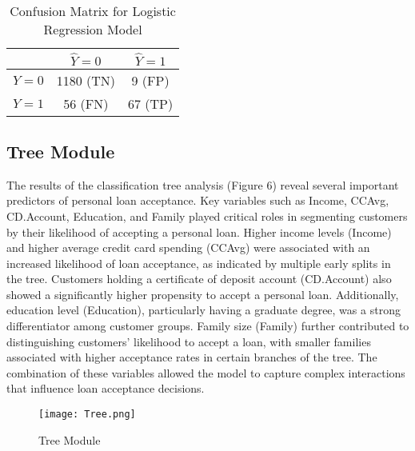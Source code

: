 \documentclass[12pt]{article}
\begin{document}
\begin{table}[h]
\centering
\renewcommand{\arraystretch}{1.5}
\begin{tabular}{|c|c|c|}
\hline
\rowcolor{blue!30}
 & $\hat{Y}=0$ & $\hat{Y}=1$ \\
\hline
$Y=0$ & 1180 (TN) & 9 (FP) \\
\hline
$Y=1$ & 56 (FN) & 67 (TP) \\
\hline
\end{tabular}
\caption{Confusion Matrix for Logistic Regression Model}
\label{tab:confusion_matrix}
\end{table}

\subsection{Tree Module}
The results of the classification tree analysis (Figure 6) reveal several important predictors of personal loan acceptance. Key variables such as Income, CCAvg, CD.Account, Education, and Family played critical roles in segmenting customers by their likelihood of accepting a personal loan. Higher income levels (Income) and higher average credit card spending (CCAvg) were associated with an increased likelihood of loan acceptance, as indicated by multiple early splits in the tree. Customers holding a certificate of deposit account (CD.Account) also showed a significantly higher propensity to accept a personal loan. Additionally, education level (Education), particularly having a graduate degree, was a strong differentiator among customer groups. Family size (Family) further contributed to distinguishing customers' likelihood to accept a loan, with smaller families associated with higher acceptance rates in certain branches of the tree. The combination of these variables allowed the model to capture complex interactions that influence loan acceptance decisions.
\begin{figure}
    \centering
    \texttt{[image: Tree.png]}
    \caption{Tree Module}
    \label{fig:enter-label}
\end{figure}
\end{document}
